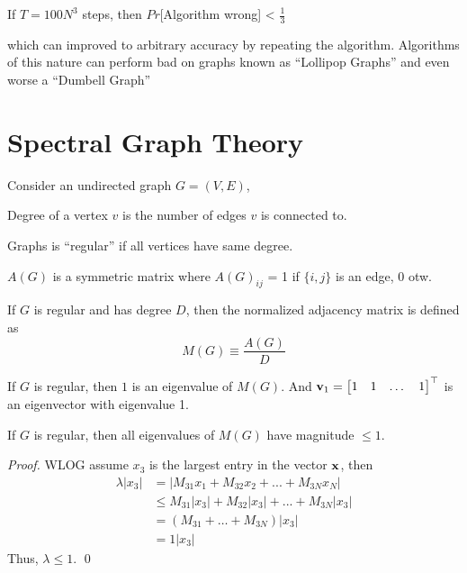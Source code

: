 \begin{proposition}[Alenilaus, 80s]
	If $T = 100N^3$ steps, then $Pr$[Algorithm wrong] < $\frac{1}{3}$
\end{proposition}
which can improved to arbitrary accuracy by repeating the algorithm. Algorithms of this nature can perform bad on graphs known as ``Lollipop Graphs'' and even worse a ``Dumbell Graph''


\section{Spectral Graph Theory}
Consider an undirected graph $G = (V, E)$, 
\begin{definition}[Degree]
	Degree of a vertex $v$ is the number of edges $v$ is connected to.
\end{definition}

\begin{definition}[Regular]
	Graphs is ``regular'' if all vertices have same degree. 
\end{definition}

\begin{definition}
	$A(G)$ is a symmetric matrix where $A(G)_{ij}$ = 1 if $\{i, j\}$ is an edge, 0 otw. 
\end{definition}

\begin{definition}
	If $G$ is regular and has degree $D$, then the normalized adjacency matrix is defined as 
	\begin{equation}
		M(G) \equiv \frac{A(G)}{D}
	\end{equation}
\end{definition}

\begin{lemma}
	If $G$ is regular, then $1$ is an eigenvalue of $M(G)$. And $\mathbf{v}_1 = \begin{bmatrix}
		1 & 1 & \dots & 1
	\end{bmatrix}^\top$ is an eigenvector with eigenvalue 1. 
\end{lemma}

\begin{proposition}
	\label{prop:eigenvalues_of_regular_graphs}
	If $G$ is regular, then all eigenvalues of $M(G)$ have magnitude $\leq 1$. 
\end{proposition}

\begin{proof}
	WLOG assume $x_3$ is the largest entry in the vector $\mathbf{x}$, then
	\begin{align}
		\lambda |x_3| 
		&= |M_{31}x_1 + M_{32}x_2 + ... + M_{3N}x_N| \\
		&\leq M_{31}|x_3| + M_{32}|x_3| + ... + M_{3N} |x_3| \\
		&= (M_{31} + \ldots + M_{3N}) |x_3| \\
		&= 1 |x_3|
	\end{align}
	Thus, $\lambda \leq 1$. \qed
\end{proof}

